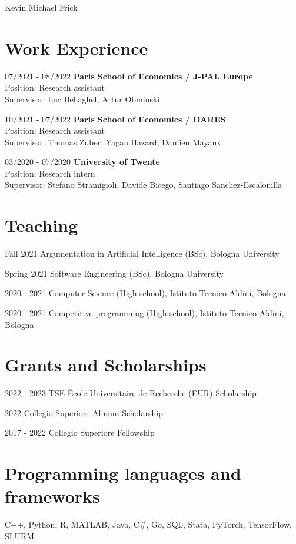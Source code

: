 \documentclass[11pt,a4paper]{article}
\begin{document}
\begin{cv}{\huge Kevin Michael Frick}
\section*{Work Experience}
\begin{cvlist}{}
	\item[07/2021 - 08/2022]
		\textbf{Paris School of Economics / J-PAL Europe}\\
		Position: Research assistant\\
		Supervisor: Luc Behaghel, Artur Obminski
	\item[10/2021 - 07/2022]
    \textbf{Paris School of Economics / DARES}\\
		Position: Research assistant\\
		Supervisor: Thomas Zuber, Yagan Hazard, Damien Mayaux
	\item[03/2020 - 07/2020]
		\textbf{University of Twente}\\
		Position: Research intern\\
		Supervisor: Stefano Stramigioli, Davide Bicego, Santiago Sanchez-Escalonilla
\end{cvlist}
\vspace{-22pt}
  \section*{Teaching}
  \begin{cvlist}{}
  \itemsep -4pt
  \item[Fall 2021] Argumentation in Artificial Intelligence (BSc), Bologna University
  \item[Spring 2021] Software Engineering (BSc), Bologna University
  \item[2020 - 2021] Computer Science (High school), Istituto Tecnico Aldini, Bologna
  \item[2020 - 2021] Competitive programming (High school), Istituto Tecnico Aldini, Bologna
  \end{cvlist}
  \vspace{-22pt}
\section*{Grants and Scholarships}
\begin{cvlist}{}
	\itemsep -4pt
	\item[2022 - 2023] TSE École Universitaire de Recherche (EUR) Scholarship
	\item[2022] Collegio Superiore Alumni Scholarship
	\item[2017 - 2022] Collegio Superiore Fellowship
\end{cvlist}
\vspace{-22pt}
\section*{Programming languages and frameworks}
    C++, Python, R, MATLAB, Java, C\#, Go, SQL, Stata, PyTorch, TensorFlow, SLURM
\end{cv}
\end{document}
